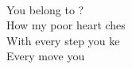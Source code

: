   \\
\songwordfb{} You belong to  ? \\
\songwordfb{} How my poor heart ches \\
With every step you ke \songwordfb{} \\
Every move you

